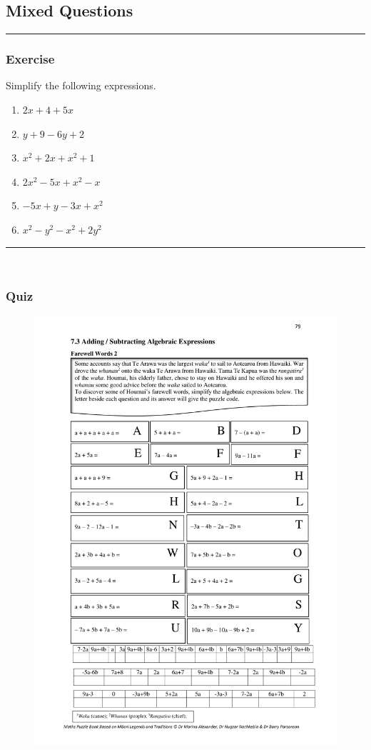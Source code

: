 \documentclass[a4paper,12pt]{article}
\newcommand\question{
	 \rule[0pt]{17cm}{0.5pt}\vspace{-0.5cm}
	\subsubsection{Exercise}

}
\newcommand\questionend{
	\rule[0pt]{17cm}{0.5pt}\vspace{0.0cm}\\
}
\newcommand\quiz{
\subsubsection{Quiz}\vspace{-0.5cm}
}
\begin{document}
\subsection{Mixed Questions}
\question
Simplify the following expressions.
\begin{multicols}{2}
	\begin{enumerate}[label=\normalsize \alph*)~~~, topsep=8pt,itemsep=12pt,partopsep=4pt, parsep=4pt]
		\item $2x+4+5x$
		\item $y+9-6y+2$
		\item $x^2+2x+x^2+1$
		\item $2x^2-5x+x^2-x$
		\item $-5x+y-3x+x^2$
		\item $x^2-y^2-x^2+2y^2$
	\end{enumerate}
\end{multicols}
\questionend
\newpage
\quiz
\begin{figure}[!h]
	\centering
	\includegraphics[width=17cm]{Qartu/Q7_Expressions_3.pdf}
\end{figure}
\newpage
\end{document}
